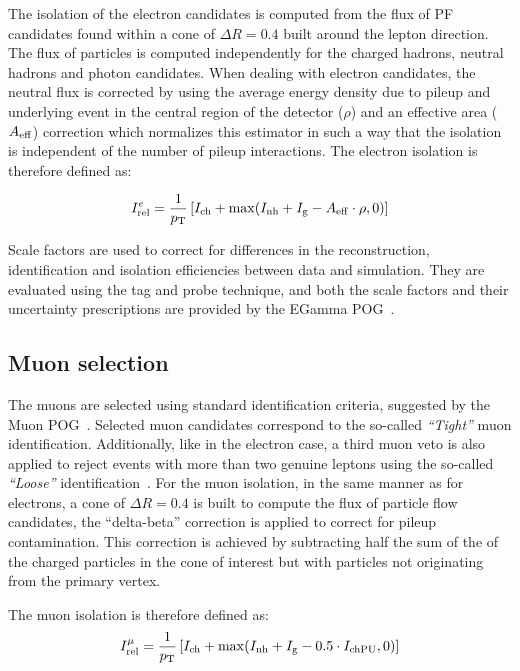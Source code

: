 The isolation of the electron candidates is computed from the flux of PF candidates found within a cone of $\Delta R = 0.4$ built around the lepton direction.
The flux of particles is computed independently for the charged hadrons, neutral hadrons and photon candidates. When dealing with electron candidates, the neutral flux is corrected by using the average energy density due to
pileup and underlying event in the central region of the detector ($\rho$)
and an effective area ($A_{\rm eff}$) correction which normalizes this
estimator in such a way that the isolation is independent of the number of pileup interactions. The electron isolation is therefore defined as:

\begin{equation}
I^{e}_{\rm rel}=\frac{1}{p_{\rm T}}  \left[ I_{\rm ch}+\max(I_{\rm nh}+I_{\rm g}-A_{\rm eff}\cdot\rho,0) \right]
\label{eq:eleisol}
\end{equation}

Scale factors are used to correct for differences in the reconstruction, 
identification and isolation efficiencies between data and simulation. They 
are evaluated using the tag and probe technique, and both the scale factors and 
their uncertainty prescriptions are provided by the EGamma POG~\cite{Twiki:EGammaSF2016}.
 

\subsection{Muon selection}
The muons are selected using standard identification criteria, suggested by the Muon POG~\cite{Twiki:MuonRun2}. Selected muon candidates correspond to the so-called {\em``Tight''} muon identification. Additionally, like in the electron case, a third muon veto is also applied to reject events with more than two genuine leptons using the so-called {\em``Loose''} identification~\cite{Twiki:MuonRun2}. 
For the muon isolation, in the same manner as for electrons, a cone of $\Delta R = 0.4$ is built to compute the flux of particle flow candidates,
the ``delta-beta'' correction is applied to correct for pileup contamination. This correction is achieved by subtracting half the sum of the \pt of the charged particles in the cone of interest but with particles not originating from the primary vertex.

The muon isolation is therefore defined as:
\begin{equation}
I^{\mu}_{\rm rel}=\frac{1}{p_{\rm T}}  \left[ I_{\rm ch}+\max(I_{\rm nh}+I_{\rm g}-0.5\cdot I_{\rm chPU} ,0) \right]
\label{eq:muisol}
\end{equation}
 
